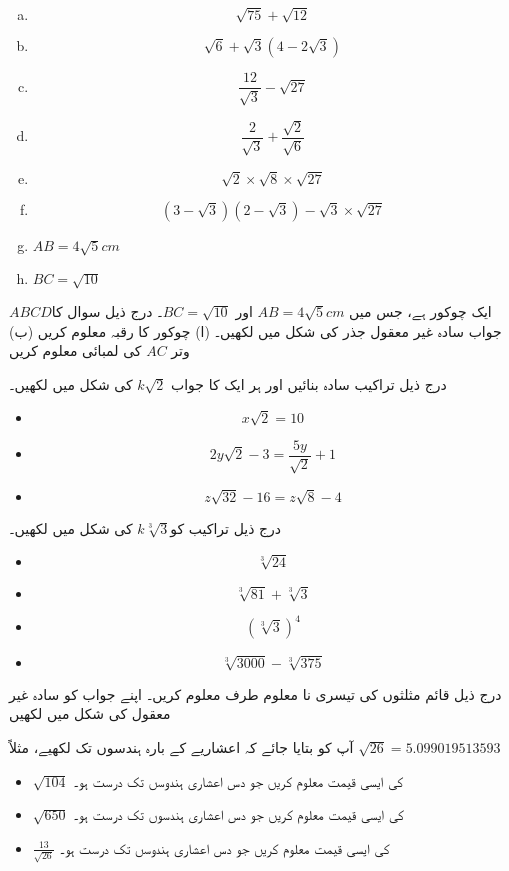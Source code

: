 \begin{multicols}{3}
\begin{enumerate}[a.]
\item 
\[\sqrt{75}+\sqrt{12}\]
\item 
\[\sqrt{6}+\sqrt{3}(4-2\sqrt{3})\]
\item
\[\frac{12}{\sqrt{3}}-\sqrt{27}\]
\item
\[\frac{2}{\sqrt{3}}+\frac{\sqrt{2}}{\sqrt{6}}\]
\item
\[\sqrt{2}\times\sqrt{8}\times\sqrt{27}\]
\item
\[(3-\sqrt{3})(2-\sqrt{3})-\sqrt{3}\times\sqrt{27}\]
\item
\(AB=4\sqrt{5}cm\)
\item
\( BC=\sqrt{10}\)
\end{enumerate}
\end{multicols}
\(ABCD\)ایک چوکور ہے، جس میں \(AB=4\sqrt{5}cm\) اور \(BC=\sqrt{10}\)۔ درج ذیل سوال کا جواب سادہ غیر معقول جذر کی شکل میں  لکھیں۔
(ا) چوکور کا رقبہ معلوم کریں
(ب) وتر \(AC\) کی لمبائی معلوم کریں

درج ذیل تراکیب سادہ بنائیں اور ہر ایک کا جواب $k \sqrt{2}$  کی شکل میں لکھیں۔
\begin{itemize}
\item
\[x\sqrt{2}=10\]
\item
\[2y\sqrt{2}-3=\frac{5y}{\sqrt{2}}+1\]
\item
\[z\sqrt{32}-16=z\sqrt{8}-4\]
\end{itemize}

درج ذیل تراکیب  کو\(k\sqrt[3]{3}\) کی شکل میں لکھیں۔

\begin{itemize}
\item
\[\sqrt[3]{24}\]
\item
\[\sqrt[3]{81}+\sqrt[3]{3}\]
\item
\[(\sqrt[3]{3})^{4}\]
\item
\[\sqrt[3]{3000}-\sqrt[3]{375}\]
\end{itemize}
درج ذیل قائم مثلثوں کی تیسری نا معلوم طرف معلوم کریں۔ اپنے جواب کو سادہ غیر معقول کی شکل میں لکھیں


آپ کو بتایا جائے کہ اعشاریے کے بارہ ہندسوں تک لکھیے، مثلاً \(\sqrt{26}=5.099019513593\)
\begin{itemize}
\item
\(\sqrt{104}\) کی ایسی قیمت معلوم کریں جو دس اعشاری ہندوسں تک درست ہو۔
\item
\(\sqrt{650}\) کی ایسی قیمت معلوم کریں جو دس اعشاری ہندسوں تک درست ہو۔
\item
\(\frac{13}{\sqrt{26}}\) کی ایسی قیمت معلوم کریں جو دس اعشاری ہندوسں تک درست ہو۔
\end{itemize}


